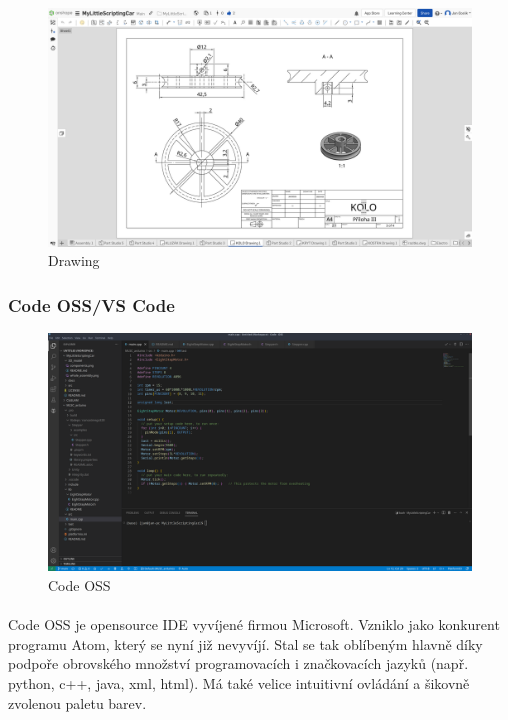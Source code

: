 \documentclass[12pt]{article}
\begin{document}
\begin{spacing}{1.5}
	\begin{figure}[H]
		\centering
		\includegraphics[width=\linewidth]{drawing_studio}
		\caption{Drawing}
		\label{fig:drawing_studio}
	\end{figure}
	
	\subsubsection{Code OSS/VS Code}
	
	\begin{figure}[H]
		\centering
		\includegraphics[width=\linewidth]{code_oss}
		\caption{Code OSS}
		\label{fig:code_oss}
	\end{figure}
	
	\paragraph{} Code OSS je opensource IDE vyvíjené firmou Microsoft. Vzniklo jako konkurent programu Atom, který se nyní již nevyvíjí. Stal se tak oblíbeným hlavně díky podpoře obrovského množství programovacích i značkovacích jazyků (např. python, c++, java, xml, html). Má také velice intuitivní ovládání a šikovně zvolenou paletu barev.
	

\end{spacing}
\end{document}
